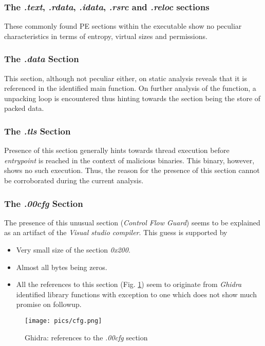 \documentclass[10pt,a4paper]{article}
\begin{document}
	\subsubsection{The \textit{.text}, \textit{.rdata}, \textit{.idata}, \textit{.rsrc} and \textit{.reloc} sections}
	These commonly found PE sections within the executable show no peculiar characteristics in terms of entropy, virtual sizes and permissions.
	\subsubsection{The \textit{.data} Section}
	This section, although not peculiar either, on static analysis reveals that it is referenced in the identified main function.
	On further analysis of the function, a unpacking loop is encountered thus hinting towards the section being the store of packed data.
	\subsubsection{The \textit{.tls} Section}
	Presence of this section generally hints towards thread execution before \textit{entrypoint} is reached in the context of malicious binaries.
	This binary, however, shows no such execution. Thus, the reason for the presence of this section cannot be corroborated during the current analysis.
	\subsubsection{The \textit{.00cfg} Section}
	The presence of this unusual section (\textit{Control Flow Guard}) seems to be explained as an artifact of the \textit{Visual studio compiler}.
	This guess is supported by
	\begin{itemize}
		\item Very small size of the section \textit{0x200}.
		\item Almost all bytes being zeros.
		\item All the references to this section (Fig. \ref{cfg}) seem to originate from \textit{Ghidra} identified library functions with exception to one which does not show much promise on followup.
	\end{itemize}
	\begin{figure}[!htbp]%
		\centering
		\texttt{[image: pics/cfg.png]}
		\caption{Ghidra: references to the \textit{.00cfg} section}
		\label{cfg}
	\end{figure}
\end{document}
